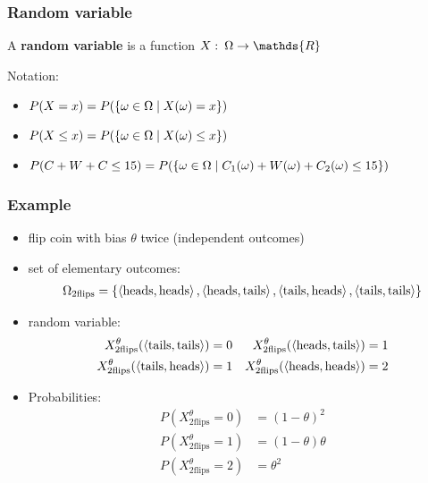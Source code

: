 \documentclass[fleqn,10pt,serif,xcolor=svgnames,xcolor=table,aspectratio=169,handout]{beamer}
\renewcommand{\markdef}[1]{\textcolor{themecolor}{\textbf{#1}}}
\begin{document}
\begin{frame}
  \frametitle{Random variable}

  A \markdef{random variable} is a function $X \mycolon \Omega \rightarrow \mathds{R}$

\bigskip
\bigskip

  Notation:
  \begin{itemize}
    \item $P(X = x) = P(\left\{\omega \in \Omega \mid X(\omega) = x\right\})$
    \item $P(X \le x) = P(\left\{\omega \in \Omega \mid X(\omega) \le x\right\})$
    \item $P(C + W + C  \le 15) = P(\left\{\omega \in \Omega \mid C_{1}(\omega) + W(\omega) + C_{2}(\omega) \le 15\right\})$
  \end{itemize}



\end{frame}

\begin{frame}
  \frametitle{Example}

  \begin{itemize}
    \item flip coin with bias $\theta$ twice (independent outcomes)
    \item set of elementary outcomes:
    \begin{align*}
      \Omega_{\text{2flips}} = \left\{\left \langle \text{heads}, \text{heads}\right\rangle, \left \langle \text{heads}, \text{tails}\right\rangle,
      \left \langle \text{tails}, \text{heads}\right\rangle, \left \langle \text{tails}, \text{tails}\right\rangle\right\}
    \end{align*}
    \item random variable:
    \begin{align*}
      X_{\text{2flips}}^{\theta}(\left \langle \text{tails}, \text{tails}\right\rangle) & = 0 & X_{\text{2flips}}^{\theta}(\left \langle \text{heads}, \text{tails}\right\rangle) & = 1 \\
      X_{\text{2flips}}^{\theta}(\left \langle \text{tails}, \text{heads}\right\rangle) & = 1 &
      X_{\text{2flips}}^{\theta}(\left \langle \text{heads}, \text{heads}\right\rangle) & = 2
    \end{align*}
    \item Probabilities:
    \begin{align*}
      P(X_{\text{2flips}}^{\theta} = 0) & = (1-\theta)^{2} \\
      P(X_{\text{2flips}}^{\theta} = 1) & = (1-\theta) \theta \\
      P(X_{\text{2flips}}^{\theta} = 2) & = \theta^{2} \\
    \end{align*}
  \end{itemize}

\end{frame}
\end{document}
